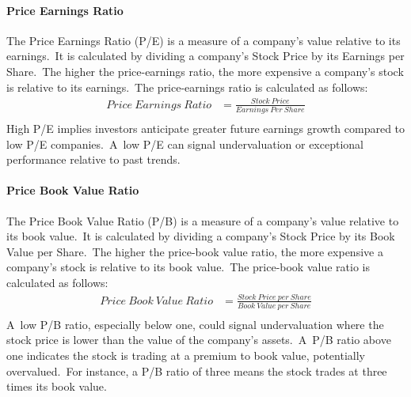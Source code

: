\documentclass[../xlapes02]{subfiles}
\begin{document}
    \paragraph{Price Earnings Ratio}\label{par:price-earnings-ratio}
    The Price Earnings Ratio (P/E) is a measure of a company's value relative to its earnings.\ It is calculated by dividing a company's Stock Price by its Earnings per Share.\ The higher the price-earnings ratio, the more expensive a company's stock is relative to its earnings.\ The price-earnings ratio is calculated as follows:
    \begin{equation}
        \label{eq:price-earnings-ratio}
        \begin{split}
            Price\ Earnings\ Ratio&=\frac{Stock\ Price}{Earnings\ Per\ Share}\\
        \end{split}
    \end{equation}
    High P/E implies investors anticipate greater future earnings growth compared to low P/E companies.\ A~low P/E can signal undervaluation or exceptional performance relative to past trends.

    \paragraph{Price Book Value Ratio}\label{par:price-book-value-ratio}
    The Price Book Value Ratio (P/B) is a measure of a company's value relative to its book value.\ It is calculated by dividing a company's Stock Price by its Book Value per Share.\ The higher the price-book value ratio, the more expensive a company's stock is relative to its book value.\ The price-book value ratio is calculated as follows:
    \begin{equation}
        \label{eq:price-book-value-ratio}
        \begin{split}
            Price\ Book\ Value\ Ratio&=\frac{Stock\ Price\ per\ Share}{Book\ Value\ per\ Share}\\
        \end{split}
    \end{equation}
    A~low P/B ratio, especially below one, could signal undervaluation where the stock price is lower than the value of the company's assets.\ A~P/B ratio above one indicates the stock is trading at a premium to book value, potentially overvalued.\ For instance, a P/B ratio of three means the stock trades at three times its book value.
\end{document}
